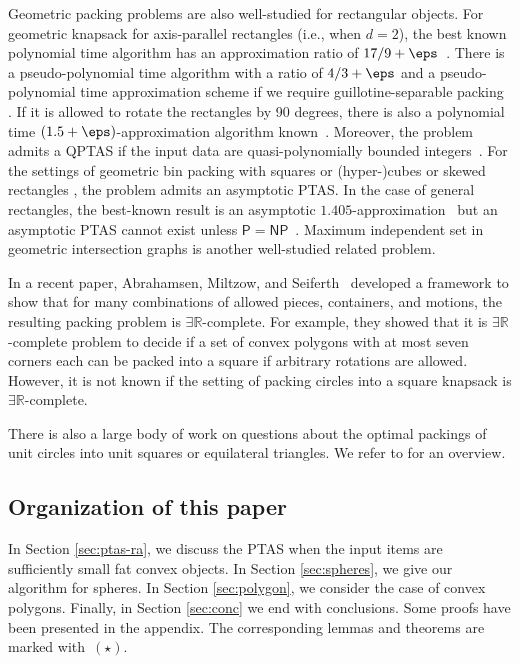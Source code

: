 \documentclass[10pt,a4paper]{article}
\theoremstyle{plain}
\theoremstyle{plain}
\theoremstyle{plain}
\theoremstyle{definition}
\newcommand{\agtwo}[1]{#1}
\begin{document}
Geometric packing problems are also well-studied for rectangular objects. 
For geometric knapsack for axis-parallel rectangles (i.e., when $d=2$),
the best known polynomial time algorithm has an approximation ratio of $17/9+\eps$~\cite{galvez2017approximating}. 
There is a pseudo-polynomial time algorithm with a ratio of $4/3+\eps$
\cite{galvez2021improved} and a pseudo-polynomial time approximation scheme if we require guillotine-separable packing \cite{KhanMSW21}. If it is allowed to rotate the rectangles
by 90 degrees, there is also a polynomial time $(1.5+\eps)$-approximation
algorithm known~\cite{galvez2017approximating}. Moreover, the problem
admits a \textsf{QPTAS} if the input data are quasi-polynomially bounded integers~\cite{adamaszek2014quasi}.
For the settings of geometric bin packing with squares or (hyper-)cubes \cite{bansal2006bin} or skewed rectangles \cite{KhanS23},  
the problem \agtwo{admits} an asymptotic \textsf{PTAS}. In the
case of general rectangles, the best-known result is an asymptotic $1.405$-approximation~\cite{bansal2014improved}
but an asymptotic \textsf{PTAS} cannot exist unless $\mathsf{P=NP}$~\cite{ChlebikC09}.
Maximum independent set in geometric intersection graphs \cite{ChanH12, Mitchell21, GalvezKMMPW22} is another well-studied related problem. 

In a recent paper, Abrahamsen, Miltzow, and Seiferth~\cite{abrahamsen2020framework}
developed a framework to show that for many combinations of allowed
pieces, containers, and motions, the resulting packing problem is
$\exists\mathbb{R}$-complete. For example, they showed that it is
$\exists\mathbb{R}$-complete problem to decide if a set of convex
polygons with at most seven corners each can be packed into a square
if arbitrary rotations are allowed. 
However, it is not known if the setting of packing circles into a
square knapsack is $\exists\mathbb{R}$-complete.

There is also a large body of work on questions about the optimal packings of unit circles into unit squares or equilateral triangles.
We refer to \cite{fekete2023packing, fodor2003densest, goldberg1971packing, hifi2009literature} for an overview. 


\subsection{Organization of this paper}
In Section \ref{sec:ptas-ra}, we discuss the \textsf{PTAS} when the input items are sufficiently small fat convex objects. In Section \ref{sec:spheres}, we give our \agtwo{algorithm} for spheres.
In Section \ref{sec:polygon}, we consider the case of convex polygons.  Finally, in Section \ref{sec:conc} we end with conclusions. 
Some proofs have been presented in the appendix. 
The corresponding lemmas and theorems are marked with~$(\star)$.
\end{document}
